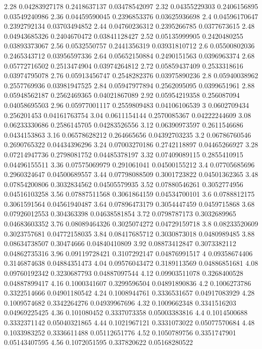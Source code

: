 {2.28 0.04283927178 0.2418637137 0.03478542097
2.32 0.04355229303 0.2406156895 0.03549240986
2.36 0.04459590045 0.2396853376 0.03625936698
2.4 0.04596170647 0.2392792134 0.03703494852
2.44 0.04760236312 0.2395266785 0.0377673615
2.48 0.04943685326 0.2404670472 0.03841128427
2.52 0.05135999905 0.2420480255 0.03893373067
2.56 0.0532550757 0.2441356319 0.03931810712
2.6 0.05500802036 0.2465343712 0.03956597336
2.64 0.05652150884 0.2490151563 0.0396963374
2.68 0.05772716502 0.2513474904 0.03974264812
2.72 0.05859437409 0.2533318616 0.03974795078
2.76 0.05913456747 0.2548282376 0.03975890236
2.8 0.05940038962 0.2557769936 0.03981947525
2.84 0.05947977894 0.2562095095 0.0399651961
2.88 0.05948562187 0.2562469365 0.04021867089
2.92 0.05954219358 0.256087094 0.04058695503
2.96 0.05977001117 0.2559809483 0.04106106539
3 0.0602709434 0.256201453 0.04161763754
3.04 0.0611154144 0.2570085367 0.04222244609
3.08 0.06233330686 0.2586145705 0.04283526556
3.12 0.06390973597 0.2611546686 0.0434153863
3.16 0.06578628212 0.264665656 0.04392703235
3.2 0.06786760546 0.2690765322 0.04434396296
3.24 0.07003270186 0.2742118897 0.04465266927
3.28 0.07214947736 0.2798081752 0.04485378197
3.32 0.07409089115 0.2855410915 0.04496155511
3.36 0.07575069979 0.291061041 0.04500155212
3.4 0.07705685696 0.2960324647 0.04500689557
3.44 0.07798088509 0.3001723822 0.04501362365
3.48 0.07854200806 0.3032834562 0.04505579935
3.52 0.07880546261 0.3052774956 0.04516103258
3.56 0.07887511568 0.3061864159 0.04534700101
3.6 0.0788812175 0.3061591564 0.04561940487
3.64 0.07896473179 0.3054447459 0.0459715868
3.68 0.07926012553 0.304363398 0.04638581854
3.72 0.0798787173 0.3032689965 0.04683603352
3.76 0.08089464326 0.3025074272 0.04729159718
3.8 0.08233520609 0.3023757681 0.04772158035
3.84 0.08417685712 0.3030873018 0.0480989485
3.88 0.08634738507 0.30474666 0.04840410809
3.92 0.08873412847 0.3073382112 0.04862735316
3.96 0.09119728421 0.3107292147 0.04876991517
4 0.09358674406 0.3146874638 0.04884351473
4.04 0.09576043472 0.3189113569 0.04886851681
4.08 0.09760192342 0.3230687793 0.04887097544
4.12 0.09903511078 0.3268400528 0.04887899417
4.16 0.1000341607 0.3299596504 0.04891890836
4.2 0.1006273786 0.3322514666 0.04901180542
4.24 0.1008944761 0.3336531657 0.04917083929
4.28 0.1009574682 0.3342264276 0.04939967696
4.32 0.1009662348 0.3341516203 0.04969225425
4.36 0.101080452 0.3337073358 0.05003383816
4.4 0.1014500688 0.3332371142 0.05040321865
4.44 0.1021967121 0.3331073022 0.05077570684
4.48 0.1033983252 0.3336611488 0.05112651776
4.52 0.1050789756 0.3351747901 0.05143407595
4.56 0.1072051595 0.337820622 0.05168280522
}
